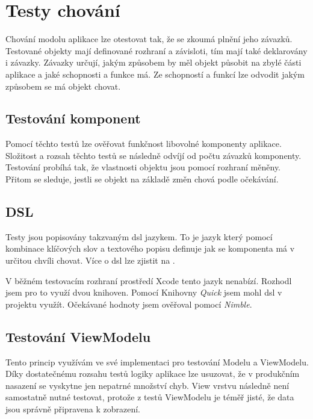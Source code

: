 \section{Testy chování}\label{testovani-bdd}

Chování modolu aplikace lze otestovat tak, že se zkoumá plnění jeho závazků.
Testované objekty mají definované rozhraní a závisloti, tím mají také deklarovány i závazky.
Závazky určují, jakým způsobem by měl objekt působit na zbylé části aplikace a jaké schopnosti a funkce má.
Ze schopností a funkcí lze odvodit jakým způsobem se má objekt chovat.

\subsection{Testování komponent}

Pomocí těchto testů lze ověřovat funkčnost libovolné komponenty aplikace.
Složitost a rozsah těchto testů se následně odvíjí od počtu závazků komponenty.
Testování probíhá tak, že vlastnosti objektu jsou pomocí rozhraní měněny.
Přitom se sleduje, jestli se objekt na základě změn chová podle očekávání. \cite{objcio-bdd}

\subsection{DSL}

Testy jsou popisovány takzvaným \acrshort{dsl} jazykem.
To je jazyk který pomocí kombinace klíčových slov a textového popisu definuje jak se komponenta má v určitou chvíli chovat.
Více o \acrshort{dsl} lze zjistit na \cite{petrikainulainen-dsl}.

V běžném testovacím rozhraní prostředí Xcode tento jazyk nenabízí.
Rozhodl jsem pro to využí dvou knihoven.
Pomocí Knihovny \textit{Quick} jsem mohl \acrshort{dsl} v projektu využít.
Očekávané hodnoty jsem ověřoval pomocí \textit{Nimble}.

\subsection{Testování ViewModelu}

Tento princip využívám ve své implementaci pro testování Modelu a ViewModelu.
Díky dostatečnému rozsahu testů logiky aplikace lze usuzovat, že v produkčním nasazení se vyskytne jen nepatrné množství chyb.
View vrstvu následně není samostatně nutné testovat, protože z testů ViewModelu je téměř jisté, že data jsou správně připravena k zobrazení.

